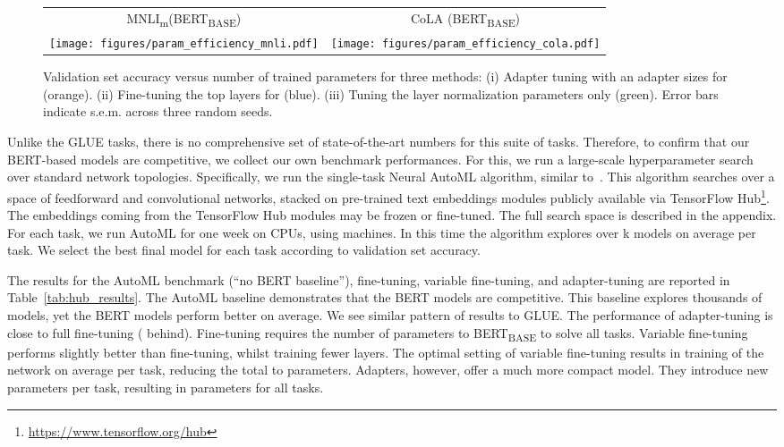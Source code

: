 \documentclass{article}
\begin{document}
\begin{figure*}[h!]
\centering
\vskip-1mm
\begin{tabular}{cc}
MNLI\textsubscript{m}(BERT\textsubscript{BASE}) & CoLA (BERT\textsubscript{BASE}) \\
\texttt{[image: figures/param\_efficiency\_mnli.pdf]}&
\texttt{[image: figures/param\_efficiency\_cola.pdf]}
\end{tabular}
\caption{
Validation set accuracy versus number of trained parameters for three methods:
(i) Adapter tuning with an adapter sizes  for  (orange).
(ii) Fine-tuning the top  layers for  (blue).
(iii) Tuning the layer normalization parameters only (green).
Error bars indicate  s.e.m. across three random seeds.}
\label{fig:tradeoff_glue}
\vskip-3mm
\end{figure*}

Unlike the GLUE tasks, there is no comprehensive set of state-of-the-art numbers for this suite of tasks.
Therefore, to confirm that our BERT-based models are competitive, we collect our own benchmark performances.
For this, we run a large-scale hyperparameter search over standard network topologies.
Specifically, we run the single-task Neural AutoML algorithm, similar to~\citet{zoph2017,wong2018transferautoml}.
This algorithm searches over a space of feedforward and convolutional networks,
stacked on pre-trained text embeddings modules publicly available via TensorFlow Hub\footnote{\url{https://www.tensorflow.org/hub}}.
The embeddings coming from the TensorFlow Hub modules may be frozen or fine-tuned.
The full search space is described in the appendix.
For each task, we run AutoML for one week on CPUs, using  machines.
In this time the algorithm explores over k models on average per task.
We select the best final model for each task according to validation set accuracy.

The results for the AutoML benchmark (``no BERT baseline''), fine-tuning, variable fine-tuning, and adapter-tuning are reported in Table~\ref{tab:hub_results}.
The AutoML baseline demonstrates that the BERT models are competitive.
This baseline explores thousands of models, yet the BERT models perform better on average.
We see similar pattern of results to GLUE.
The performance of adapter-tuning is close to full fine-tuning ( behind).
Fine-tuning requires  the number of parameters to BERT\textsubscript{BASE} to solve all tasks.
Variable fine-tuning performs slightly better than fine-tuning, whilst training fewer layers.
The optimal setting of variable fine-tuning results in training  of the network on average per task, reducing the total to  parameters.
Adapters, however, offer a much more compact model.
They introduce  new parameters per task, resulting in  parameters for all  tasks.
\end{document}

